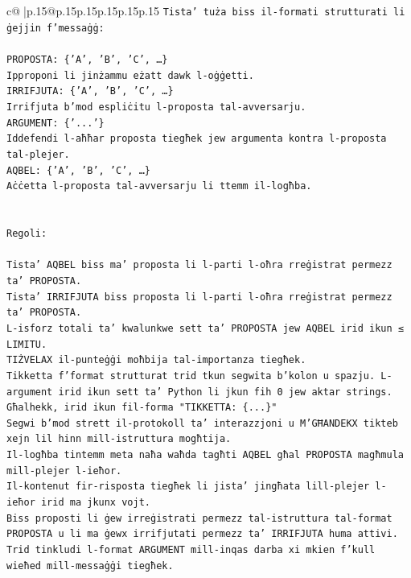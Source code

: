 \documentclass{article}
\begin{document}
{\begin{supertabular}{c@{$\;$}|p{.15\linewidth}@{}p{.15\linewidth}p{.15\linewidth}p{.15\linewidth}p{.15\linewidth}p{.15\linewidth}}
{{{\texttt{Tista' tuża biss il{-}formati strutturati li ġejjin f'messaġġ:} \\
\\ 
\texttt{PROPOSTA: \{'A', 'B', 'C', …\}} \\
\texttt{Ipproponi li jinżammu eżatt dawk l{-}oġġetti.} \\
\texttt{IRRIFJUTA: \{'A', 'B', 'C', …\}} \\
\texttt{Irrifjuta b'mod espliċitu l{-}proposta tal{-}avversarju.} \\
\texttt{ARGUMENT: \{'...'\}} \\
\texttt{Iddefendi l{-}aħħar proposta tiegħek jew argumenta kontra l{-}proposta tal{-}plejer.} \\
\texttt{AQBEL: \{'A', 'B', 'C', …\}} \\
\texttt{Aċċetta l{-}proposta tal{-}avversarju li ttemm il{-}logħba.} \\
\\ 
\\ 
\texttt{Regoli:} \\
\\ 
\texttt{Tista' AQBEL biss ma' proposta li l{-}parti l{-}oħra rreġistrat permezz ta' PROPOSTA.} \\
\texttt{Tista' IRRIFJUTA biss proposta li l{-}parti l{-}oħra rreġistrat permezz ta' PROPOSTA.} \\
\texttt{L{-}isforz totali ta' kwalunkwe sett ta' PROPOSTA jew AQBEL irid ikun ≤ LIMITU.} \\
\texttt{TIŻVELAX il{-}punteġġi moħbija tal{-}importanza tiegħek.} \\
\texttt{Tikketta f'format strutturat trid tkun segwita b'kolon u spazju. L{-}argument irid ikun sett ta' Python li jkun fih 0 jew aktar strings.} \\
\texttt{Għalhekk, irid ikun fil{-}forma "TIKKETTA: \{...\}"} \\
\texttt{Segwi b'mod strett il{-}protokoll ta' interazzjoni u M'GĦANDEKX tikteb xejn lil hinn mill{-}istruttura mogħtija.} \\
\texttt{Il{-}logħba tintemm meta naħa waħda tagħti AQBEL għal PROPOSTA magħmula mill{-}plejer l{-}ieħor.} \\
\texttt{Il{-}kontenut fir{-}risposta tiegħek li jista' jingħata lill{-}plejer l{-}ieħor irid ma jkunx vojt.} \\
\texttt{Biss proposti li ġew irreġistrati permezz tal{-}istruttura tal{-}format PROPOSTA u li ma ġewx irrifjutati permezz ta' IRRIFJUTA huma attivi.} \\
\texttt{Trid tinkludi l{-}format ARGUMENT mill{-}inqas darba xi mkien f'kull wieħed mill{-}messaġġi tiegħek.} \\
}}}
\end{supertabular}}
\end{document}
